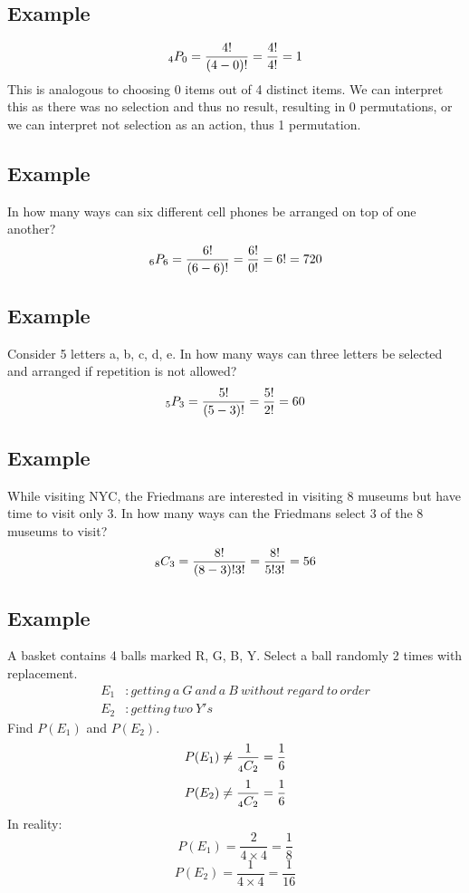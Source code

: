 \documentclass{math}
\begin{document}
\subsection*{Example}
\[ _{4}P_{0} = \frac{4!}{(4-0)!} = \frac{4!}{4!} = 1\]
This is analogous to choosing 0 items out of 4 distinct items. We can
interpret this as there was no selection and thus no result, resulting in 0
permutations, or we can interpret not selection as an action, thus 1
permutation.

\subsection*{Example}
In how many ways can six different cell phones be arranged on top of one
another?
\[ _{6}P_{6} = \frac{6!}{(6-6)!} = \frac{6!}{0!} = 6! = 720 \]

\subsection*{Example}
Consider 5 letters a, b, c, d, e. In how many ways can three letters be
selected and arranged if repetition is not allowed?
\[ _{5}P_{3} = \frac{5!}{(5-3)!} = \frac{5!}{2!} = 60 \]

\subsection*{Example}
While visiting NYC, the Friedmans are interested in visiting 8 museums but have
time to visit only 3. In how many ways can the Friedmans select 3 of the 8
museums to visit?
\[ _{8}C_{3} = \frac{8!}{(8-3)!3!} = \frac{8!}{5!3!} = 56 \]

\subsection*{Example}
A basket contains 4 balls marked R, G, B, Y. Select a ball randomly 2 times
with replacement.
\begin{align*}
  E_{1}&: getting\ a\ G\ and\ a\ B\ without\ regard\ to\ order \\
  E_{2}&: getting\ two\ Y's
\end{align*}
Find \( P(E_{1}) \) and \( P(E_{2}) \).
\[ P(E_{1}) \neq \frac{1}{_{4}C_{2}} = \frac{1}{6} \]
\[ P(E_{2}) \neq \frac{1}{_{4}C_{2}} = \frac{1}{6} \]
In reality:
\[ P(E_{1}) = \frac{2}{4\times4} = \frac{1}{8} \]
\[ P(E_{2}) = \frac{1}{4\times4} = \frac{1}{16} \]
\end{document}
